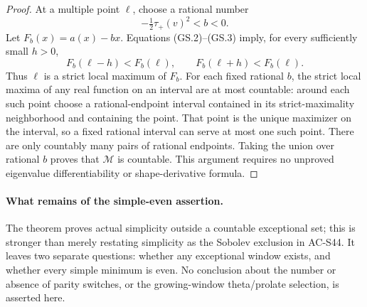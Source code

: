 \begin{proof}
At a multiple point \(\ell\), choose a rational number
\[
                         -\tfrac12\tau_+(v)^2<b<0.
\]
Let \(F_b(x)=a(x)-bx\).
Equations (GS.2)--(GS.3) imply, for every sufficiently small
\(h>0\),
\[
             F_b(\ell-h)<F_b(\ell),
             \qquad F_b(\ell+h)<F_b(\ell).               \tag{GS.13}
\]
Thus \(\ell\) is a strict local maximum of \(F_b\).
For each fixed rational \(b\), the strict local maxima of
any real function on an interval are at most countable:
around each such point choose a rational-endpoint interval
contained in its strict-maximality neighborhood and containing
the point.  That point is the unique maximizer on the interval,
so a fixed rational interval can serve at most one such point.
There are only countably many pairs of rational endpoints.
Taking the union over rational \(b\) proves that \(\mathcal M\)
is countable.  This argument requires no unproved
eigenvalue differentiability or shape-derivative formula.
\end{proof}

\paragraph{What remains of the simple-even assertion.}
The theorem proves actual simplicity outside a countable
exceptional set; this is stronger than merely restating
simplicity as the Sobolev exclusion in AC-S44.
It leaves two separate questions: whether any exceptional
window exists, and whether every simple minimum is even.
No conclusion about the number or absence of parity switches,
or the growing-window theta/prolate selection, is asserted here.

